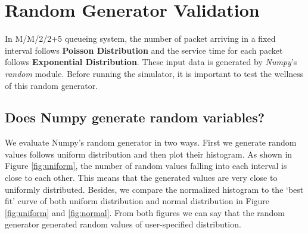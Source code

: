 \documentclass[12pt]{article}  %
\theoremstyle{definition}
\theoremstyle{remark}
\begin{document}
\section{Random Generator Validation}
In M/M/2/2+5 queueing system, the number of packet arriving in a fixed interval follows \textbf{Poisson Distribution} and the service time for each packet follows \textbf{Exponential Distribution}.
These input data is generated by \textit{Numpy}'s \textit{random} module.
Before running the simulator, it is important to test the wellness of this random generator.

\subsection{Does Numpy generate random variables?}
We evaluate Numpy's random generator in two ways. First we generate random values follows uniform distribution and then plot their histogram.
As shown in Figure \ref{fig:uniform}, the number of random values falling into each interval is close to each other.
This means that the generated values are very close to uniformly distributed.
Besides, we compare the normalized histogram to the `best fit' curve of both uniform distribution and normal distribution in Figure \ref{fig:uniform} and \ref{fig:normal}.
From both figures we can say that the random generator generated random values of user-specified distribution.
\end{document}
